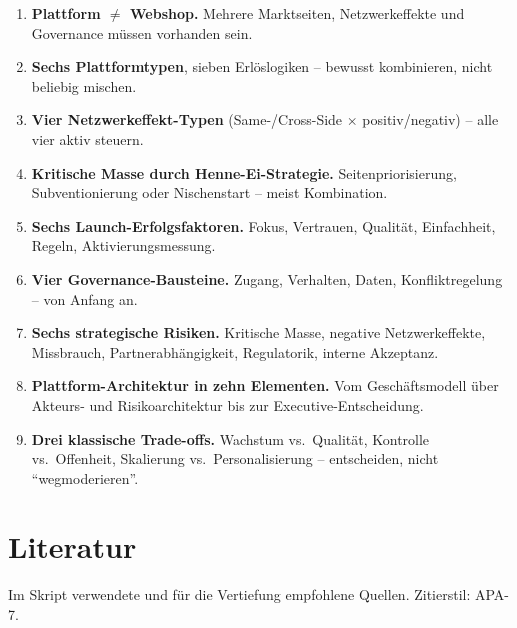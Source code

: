 \documentclass[11pt,a4paper,oneside]{article}
\begin{document}
\begin{enumerate}
  \item \textbf{Plattform $\ne$ Webshop.} Mehrere Marktseiten, Netzwerkeffekte und Governance müssen vorhanden sein.
  \item \textbf{Sechs Plattformtypen}, sieben Erlöslogiken -- bewusst kombinieren, nicht beliebig mischen.
  \item \textbf{Vier Netzwerkeffekt-Typen} (Same-/Cross-Side $\times$ positiv/negativ) -- alle vier aktiv steuern.
  \item \textbf{Kritische Masse durch Henne-Ei-Strategie.} Seitenpriorisierung, Subventionierung oder Nischenstart -- meist Kombination.
  \item \textbf{Sechs Launch-Erfolgsfaktoren.} Fokus, Vertrauen, Qualität, Einfachheit, Regeln, Aktivierungsmessung.
  \item \textbf{Vier Governance-Bausteine.} Zugang, Verhalten, Daten, Konfliktregelung -- von Anfang an.
  \item \textbf{Sechs strategische Risiken.} Kritische Masse, negative Netzwerkeffekte, Missbrauch, Partnerabhängigkeit, Regulatorik, interne Akzeptanz.
  \item \textbf{Plattform-Architektur in zehn Elementen.} Vom Geschäftsmodell über Akteurs- und Risikoarchitektur bis zur Executive-Entscheidung.
  \item \textbf{Drei klassische Trade-offs.} Wachstum vs.\ Qualität, Kontrolle vs.\ Offenheit, Skalierung vs.\ Personalisierung -- entscheiden, nicht ``wegmoderieren''.
\end{enumerate}

\clearpage
\section{Literatur}

Im Skript verwendete und für die Vertiefung empfohlene Quellen. Zitierstil: APA-7.
\end{document}

